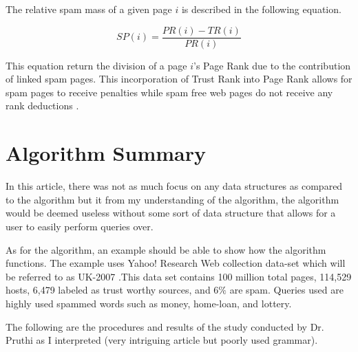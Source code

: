 \documentclass[letter, 11pt]{article}
\begin{document}
\begin{doublespace}
The relative spam mass of a given page $i$ is described in the following equation.

\begin{equation}
  \label{eq:2} SP(i) = \dfrac{PR(i) - TR(i)}{PR(i)}
\end{equation}

This equation return the division of a page $i$'s Page Rank due to the contribution of linked spam pages. This incorporation of Trust Rank into Page Rank allows for spam pages to receive penalties while spam free web pages do not receive any rank deductions \cite{Query}.
\end{doublespace}

\vspace{-7pt}
\section*{Algorithm Summary}
\vspace{-10pt}
\begin{doublespace}
In this article, there was not as much focus on any data structures as compared to the algorithm but it from my understanding of the algorithm, the algorithm would be deemed useless without some sort of data structure that allows for a user to easily perform queries over.

As for the algorithm, an example should be able to show how the algorithm functions. The example uses Yahoo! Research Web collection data-set which will be referred to as UK-2007 \cite{Yahoo!}.This data set contains 100 million total pages, 114,529 hosts, 6,479 labeled as trust worthy sources, and $6\%$ are spam. Queries used are highly used spammed words such as money, home-loan, and lottery.

The following are the procedures and results of the study conducted by Dr. Pruthi as I interpreted (very intriguing article but poorly used grammar).
\end{doublespace}
\vspace{-7pt}
\end{document}
